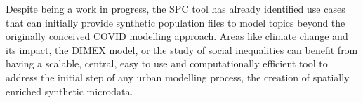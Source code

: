 \documentclass{article}
\begin{document}
\noindent Despite being a work in progress, the SPC tool has already identified use cases that can initially provide synthetic population files to model topics beyond the originally conceived COVID modelling approach. Areas like climate change and its impact, the DIMEX model, or the study of social inequalities can benefit from having a scalable, central, easy to use and computationally efficient tool to address the initial step of any urban modelling process, the creation of spatially enriched synthetic microdata.




\newpage 


\newpage 

\end{document}
